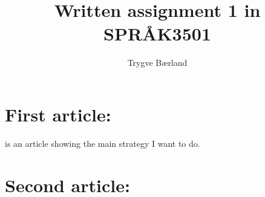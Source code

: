 \documentclass[11pt, a4paper]{article}
\begin{document}
\title{Written assignment 1 in SPRÅK3501}
\author{Trygve Bærland}
\maketitle
\section*{First article:}
\cite{Cifani} is an article showing the main strategy I want to do.

\section*{Second article:}
\cite{Schochet}

\newpage


\end{document}
